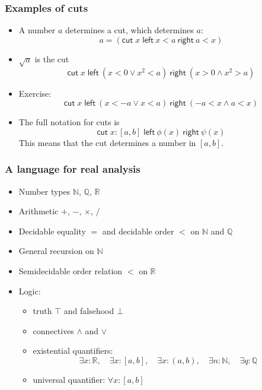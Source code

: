 \documentclass{beamer}
\newcommand{\NN}{\mathbb{N}}
\newcommand{\QQ}{\mathbb{Q}}
\newcommand{\RR}{\mathbb{R}}
\newcommand{\cut}[3]{\mathsf{cut}\; #1\; \mathsf{left}\ #2\ 
  \mathsf{right}\  #3}
\begin{document}
\begin{frame}
  \frametitle{Examples of cuts}

  \begin{itemize}

  \item A number $a$ determines a cut, which determines $a$:
    \begin{equation*}
      a = (\cut{x}{x < a}{a < x})
    \end{equation*}
  \item $\sqrt{a}$ is the cut
    \begin{equation*}
      \cut{x}{(x < 0 \lor x^2 < a)}{(x > 0 \land x^2 > a)}
    \end{equation*}
  \item Exercise:
    \begin{equation*}
      \cut{x}{(x < -a \lor x < a)}{(-a < x \land a < x)}
    \end{equation*}
  \item The full notation for cuts is
    \begin{equation*}
      \cut{x : [a,b]}{\phi(x)}{\psi(x)}
    \end{equation*}
    This means that the cut determines a number in $[a,b]$.
  \end{itemize}

\end{frame}

\begin{frame}
  \frametitle{A language for real analysis}

  \begin{itemize}
  \item Number types $\NN$, $\QQ$, $\RR$
  \item Arithmetic $+$, $-$, $\times$, $/$
  \item Decidable equality $=$ and decidable order $<$ on $\NN$ and $\QQ$
  \item General recursion on $\NN$
  \item Semidecidable order relation $<$ on $\RR$
  \item Logic:
    \begin{itemize}
    \item truth $\top$ and falsehood $\bot$
    \item connectives $\land$ and $\lor$
    \item existential quantifiers:
      \begin{equation*}
        \exists x : \RR, \quad
        \exists x : [a,b], \quad
        \exists x : (a,b), \quad
        \exists n : \NN, \quad
        \exists q : \QQ        
      \end{equation*}
    \item universal quantifier: \quad $\forall x : [a,b]$
    \end{itemize}
  \end{itemize}
\end{frame}
\end{document}
